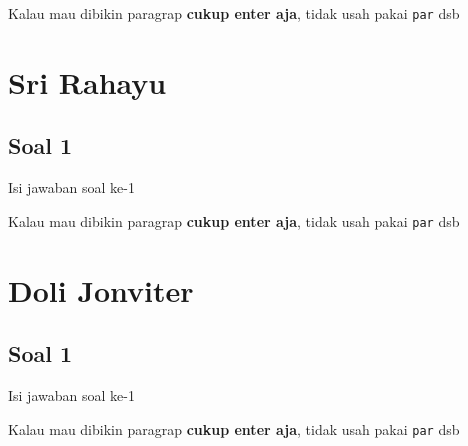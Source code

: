 Kalau mau dibikin paragrap \textbf{cukup enter aja}, tidak usah pakai \verb|par| dsb



\section{Sri Rahayu}
\subsection{Soal 1}
Isi jawaban soal ke-1

Kalau mau dibikin paragrap \textbf{cukup enter aja}, tidak usah pakai \verb|par| dsb



\section{Doli Jonviter}
\subsection{Soal 1}
Isi jawaban soal ke-1

Kalau mau dibikin paragrap \textbf{cukup enter aja}, tidak usah pakai \verb|par| dsb



